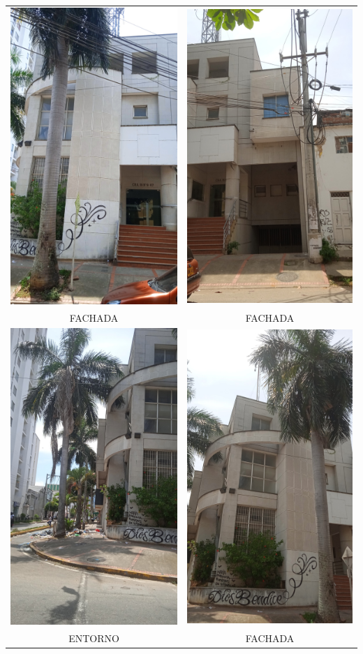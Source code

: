 \documentclass[12pt,a4paper,twoside]{article}
\begin{document}
{\begin{tabular}{ c c }
	
	\includegraphics[width = 3 cm]{Imagenes/1} & \includegraphics[width = 3 cm]{Imagenes/2} \\
	FACHADA  & FACHADA  \\
	\includegraphics[width = 3 cm]{Imagenes/3} & \includegraphics[width = 3 cm]{Imagenes/4} \\
	ENTORNO & FACHADA\\

\end{tabular}}
\end{document}

